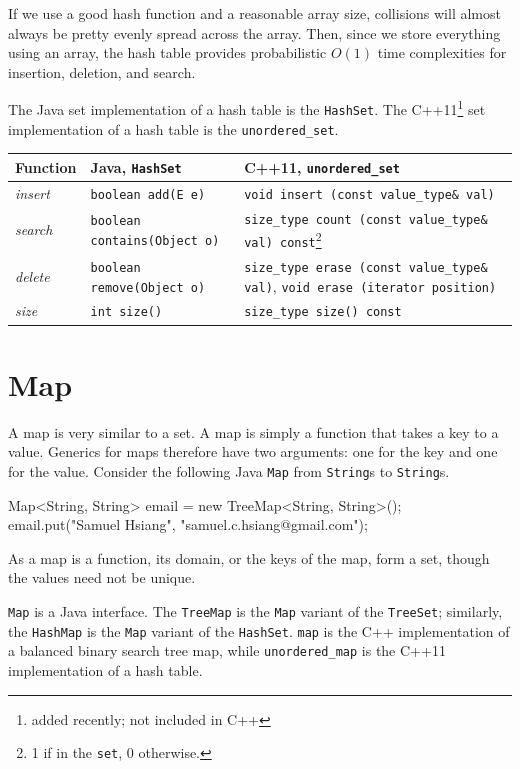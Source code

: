 If we use a good hash function and a reasonable array size, collisions will almost always be pretty evenly spread across the array. Then, since we store everything using an array, the hash table provides probabilistic $O(1)$ time complexities for insertion, deletion, and search.

The Java set implementation of a hash table is the \texttt{HashSet}. The C++11\footnote{added recently; not included in C++} set implementation of a hash table is the \texttt{unordered\_set}.

\begin{center}
    \begin{tabular}{ p{5cm} p{5cm} p{5cm} }
	Function	&	Java, \texttt{HashSet}	&	C++11, \texttt{unordered\_set} \\
	\hline
	\textit{insert}		&	\texttt{boolean add(E e)}	&	\texttt{void insert (const value\_type\& val)} \\
   \textit{search}		&	\texttt{boolean contains(Object o)}	&	\texttt{size\_type count (const value\_type\& val) const}\footnote{1 if in the \texttt{set}, 0 otherwise.}	\\
    \textit{delete}		&	\texttt{boolean	remove(Object o)}		&	\texttt{size\_type erase (const value\_type\& val)}, \texttt{void erase (iterator position)} \\
    \textit{size} & \texttt{int size()} & \texttt{size\_type size() const}
    \end{tabular}
\end{center}

\section{Map}

A map is very similar to a set. A map is simply a function that takes a key to a value. Generics for maps therefore have two arguments: one for the key and one for the value. Consider the following Java \texttt{Map} from \texttt{String}s to \texttt{String}s.

\begin{mylstlisting}
Map<String, String> email = new TreeMap<String, String>();
email.put("Samuel Hsiang", "samuel.c.hsiang@gmail.com");
\end{mylstlisting}

As a map is a function, its domain, or the keys of the map, form a set, though the values need not be unique.

\texttt{Map} is a Java interface. The \texttt{TreeMap} is the \texttt{Map} variant of the \texttt{TreeSet}; similarly, the \texttt{HashMap} is the \texttt{Map} variant of the \texttt{HashSet}. \texttt{map} is the C++ implementation of a balanced binary search tree map, while \texttt{unordered\_map} is the C++11 implementation of a hash table.

